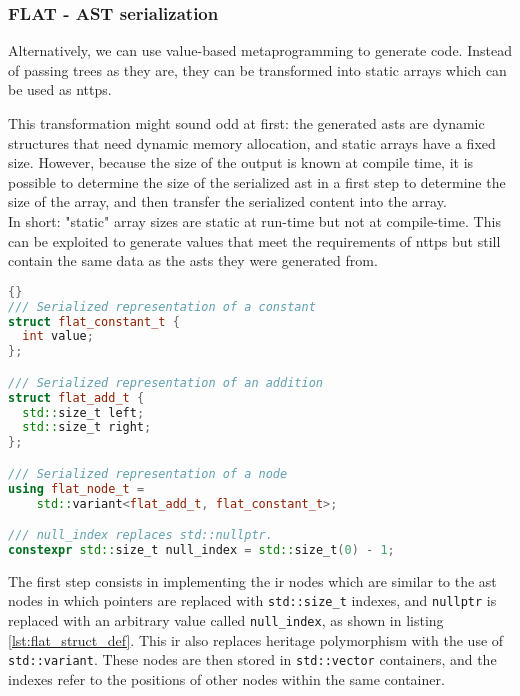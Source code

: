 \documentclass[../main]{subfiles}
\begin{document}
\subsubsection{
  FLAT - AST serialization
}

\label{lbl:flat-technique}

Alternatively, we can use value-based metaprogramming to generate code.
Instead of passing trees as they are,
they can be transformed into static arrays which can be used as \glspl{nttp}.

This transformation might sound odd at first: the generated \glspl{ast} are
dynamic structures that need dynamic memory allocation, and static arrays
have a fixed size. However, because the size of the output is known
at compile time, it is possible to determine the size of the serialized
\gls{ast} in a first step to determine the size of the array,
and then transfer the serialized content into the array.
\\

In short: "static" array sizes are static at run-time but not at compile-time.
This can be exploited to generate values that meet the requirements
of \glspl{nttp} but still contain the same data as the \glspl{ast} they were
generated from.

\begin{lstlisting}[language=C++, label=lst:flat_struct_def]{}
/// Serialized representation of a constant
struct flat_constant_t {
  int value;
};

/// Serialized representation of an addition
struct flat_add_t {
  std::size_t left;
  std::size_t right;
};

/// Serialized representation of a node
using flat_node_t =
    std::variant<flat_add_t, flat_constant_t>;

/// null_index replaces std::nullptr.
constexpr std::size_t null_index = std::size_t(0) - 1;
\end{lstlisting}

The first step consists in implementing the \gls{ir} nodes which are similar
to the \gls{ast} nodes in which pointers are replaced with
\lstinline{std::size_t} indexes,
and \lstinline{nullptr} is replaced with an arbitrary value called
\lstinline{null_index}, as shown in listing \ref{lst:flat_struct_def}.
This \gls{ir} also replaces heritage polymorphism with the use of
\lstinline{std::variant}.
These nodes are then stored in \lstinline{std::vector} containers,
and the indexes refer to the positions of other nodes within the same container.
\end{document}
